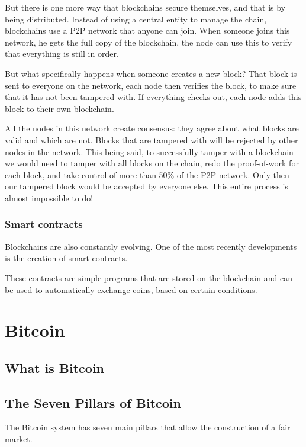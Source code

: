 \documentclass{article}
\newcommand\tab[1][1cm]{\hspace*{#1}}
\begin{document}
But there is one more way that blockchains secure themselves, and that is by being distributed. Instead of using a central entity to manage the chain, blockchains use a P2P network that anyone can join. When someone joins this network, he gets the full copy of the blockchain, the node can use this to verify that everything is still in order.

But what specifically happens when someone creates a new block? That block is sent to everyone on the network, each node then verifies the block, to make sure that it has not been tampered with. If everything checks out, each node adds this block to their own blockchain. 

All the nodes in this network create consensus: they agree about what blocks are valid and which are not. Blocks that are tampered with will be rejected by other nodes in the network. This being said, to successfully tamper with a blockchain we would need to tamper with all blocks on the chain, redo the proof-of-work for each block, and take control of more than 50\% of the P2P network. Only then our tampered block would be accepted by everyone else. This entire process is almost impossible to do!

\subsubsection{Smart contracts}

\tab Blockchains are also constantly evolving. One of the most recently developments is the creation of smart contracts.

These contracts are simple programs that are stored on the blockchain and can be used to automatically exchange coins, based on certain conditions.

\section{Bitcoin}

\subsection{What is Bitcoin}

\subsection{The Seven Pillars of Bitcoin}

\tab The Bitcoin system has seven main pillars that allow the construction of a fair market. 
\end{document}
